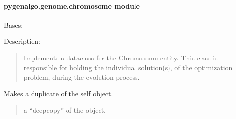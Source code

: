 \documentclass[letterpaper,10pt,english]{sphinxmanual}
\begin{document}
\paragraph{pygenalgo.genome.chromosome module}
\label{\detokenize{pygenalgo.genome:module-pygenalgo.genome.chromosome}}\label{\detokenize{pygenalgo.genome:pygenalgo-genome-chromosome-module}}

\begin{fulllineitems}
\label{\detokenize{pygenalgo.genome:pygenalgo.genome.chromosome.Chromosome}}
\pysigstartsignatures
{}
\pysigstopsignatures
\sphinxAtStartPar
Bases: 

\sphinxAtStartPar
Description:
\begin{quote}

\sphinxAtStartPar
Implements a dataclass for the Chromosome entity. This class is responsible
for holding the individual solution(s), of the optimization problem, during
the evolution process.
\end{quote}

\begin{fulllineitems}
\label{\detokenize{pygenalgo.genome:pygenalgo.genome.chromosome.Chromosome.clone}}
\pysigstartsignatures
{}
\pysigstopsignatures
\sphinxAtStartPar
Makes a duplicate of the self object.
\begin{quote}\begin{description}
\sphinxAtStartPar
a “deep\sphinxhyphen{}copy” of the object.

\end{description}\end{quote}


\end{fulllineitems}
\end{fulllineitems}
\end{document}
